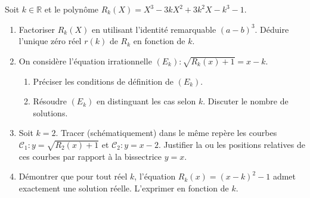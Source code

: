 \documentclass[11pt]{article}
\begin{document}
\begin{exercice}
Soit $k \in \mathbb{R}$ et le polynôme $R_k(X)=X^3 - 3kX^2 + 3k^2X - k^3 - 1$.
\begin{enumerate}
    \item Factoriser $R_k(X)$ en utilisant l'identité remarquable $(a-b)^3$. Déduire l'unique zéro réel $r(k)$ de $R_k$ en fonction de $k$.
    \item On considère l'équation irrationnelle $(E_k) : \sqrt{R_k(x)+1} = x - k$.
    \begin{enumerate}
        \item Préciser les conditions de définition de $(E_k)$.
        \item Résoudre $(E_k)$ en distinguant les cas selon $k$. Discuter le nombre de solutions.
    \end{enumerate}
    \item Soit $k=2$. Tracer (schématiquement) dans le même repère les courbes $\mathcal{C}_1 : y = \sqrt{R_2(x)+1}$ et $\mathcal{C}_2 : y = x-2$. Justifier la ou les positions relatives de ces courbes par rapport à la bissectrice $y=x$.
    \item Démontrer que pour tout réel $k$, l'équation $R_k(x) = (x-k)^2 - 1$ admet exactement une solution réelle. L'exprimer en fonction de $k$.
\end{enumerate}
\end{exercice}
\end{document}
